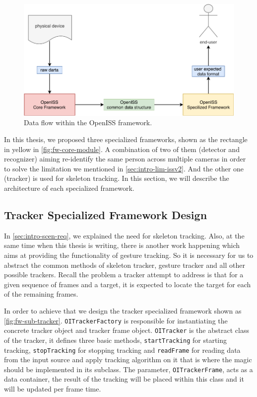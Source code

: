 \begin{figure}
    \centering
    \includegraphics[scale=0.8]{figures/framework_dataflow.pdf}
    \caption{Data flow within the OpenISS framework.}
    \label{fig:fw-design-dataflow}
\end{figure}

In this thesis, we proposed three specialized frameworks, shown as the
rectangle in yellow in \autoref{fig:fw-core-module}. A combination of two
of them (detector and recognizer) aiming re-identify the same person across
multiple cameras in order to solve the limitation we mentioned in
\autoref{sec:intro-lim-issv2}.
And the other one (tracker) is used for skeleton tracking.
In this section, we will describe the architecture of each specialized
framework.

\subsection{Tracker Specialized Framework Design}
\label{sec:fw-design-spec-tracker}

In \autoref{sec:intro-scen-req}, we explained the need for skeleton tracking.
Also, at the same time when this thesis is writing, there is another work
happening which aims at providing the functionality of gesture tracking. So it
is necessary for us to abstract the common methods of skeleton tracker, gesture
tracker and all other possible trackers.
Recall the problem a tracker attempt to address is that for a given sequence of
frames and a target, it is expected to locate the target for each of the
remaining frames.

In order to achieve that we design the tracker specialized framework shown as
\autoref{fig:fw-sub-tracker}. \texttt{OITrackerFactory} is responsible for
instantiating the concrete tracker object and tracker frame object.
\texttt{OITracker} is the abstract class of the tracker, it defines three basic
methods, \texttt{startTracking} for starting tracking, \texttt{stopTracking}
for stopping tracking and \texttt{readFrame} for reading data from the input
source and apply tracking algorithm on it that is where the magic should be
implemented in its subclass. The parameter, \texttt{OITrackerFrame}, acts as a
data container, the result of the tracking will be placed within this class and
it will be updated per frame time.

